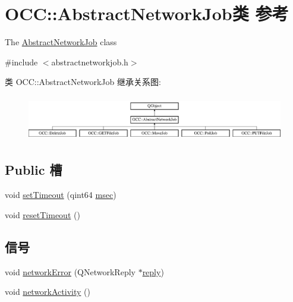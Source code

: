\hypertarget{class_o_c_c_1_1_abstract_network_job}{}\section{O\+CC\+:\+:Abstract\+Network\+Job类 参考}
\label{class_o_c_c_1_1_abstract_network_job}


The \hyperlink{class_o_c_c_1_1_abstract_network_job}{Abstract\+Network\+Job} class  




{\ttfamily \#include $<$abstractnetworkjob.\+h$>$}

类 O\+CC\+:\+:Abstract\+Network\+Job 继承关系图\+:\begin{figure}[H]
\begin{center}
\leavevmode
\includegraphics[height=2.000000cm]{class_o_c_c_1_1_abstract_network_job}
\end{center}
\end{figure}
\subsection*{Public 槽}
\begin{DoxyCompactItemize}
\item 
void \hyperlink{class_o_c_c_1_1_abstract_network_job_ae278929d9b46b8e705d044938c172ae9}{set\+Timeout} (qint64 \hyperlink{utility_8cpp_a1be2dbfd71764ac5ccdfe9183a80ed6f}{msec})
\item 
void \hyperlink{class_o_c_c_1_1_abstract_network_job_a40ad0e833d89ebe39dc6b45c6ee4971b}{reset\+Timeout} ()
\end{DoxyCompactItemize}
\subsection*{信号}
\begin{DoxyCompactItemize}
\item 
void \hyperlink{class_o_c_c_1_1_abstract_network_job_ad474d13905dbb6431e40d8de701aae8e}{network\+Error} (Q\+Network\+Reply $\ast$\hyperlink{class_o_c_c_1_1_abstract_network_job_a38ee84a458ae0792e5bc01e57a59259b}{reply})
\item 
void \hyperlink{class_o_c_c_1_1_abstract_network_job_a67cafd60451812c108d46c02c1f1d1a2}{network\+Activity} ()
\end{DoxyCompactItemize}

